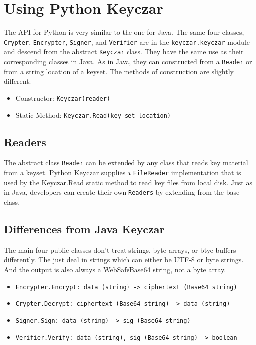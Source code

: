 \documentclass{llncs}
\begin{document}
\section{Using Python Keyczar}

The API for Python is very similar to the one for Java. The same four classes,
{\tt Crypter}, {\tt Encrypter}, {\tt Signer}, and {\tt Verifier} are in the
{\tt keyczar.keyczar} module and descend from the abstract {\tt Keyczar} class.
They have the same use as their corresponding classes in Java. As in Java, they
can constructed from a {\tt Reader} or from a string location of a keyset. The
methods of construction are slightly different:

\begin{itemize}
  \item Constructor: {\tt Keyczar(reader)}
  \item Static Method: \verb|Keyczar.Read(key_set_location)|
\end{itemize}

\subsection{Readers}

The abstract class {\tt Reader} can be extended by any class that reads key
material from a keyset. Python Keyczar supplies a {\tt FileReader}
implementation that is used by the {Keyczar.Read} static method to read key
files from local disk. Just as in Java, developers can create their own
{\tt Readers} by extending from the base class.

\subsection{Differences from Java Keyczar}

The main four public classes don't treat strings, byte arrays, or btye
buffers differently. The just deal in strings which can either be UTF-8 or
byte strings. And the output is also always a WebSafeBase64 string, not a byte
array.
\begin{itemize}
  \item {\tt Encrypter.Encrypt: data (string) -> ciphertext (Base64 string)}
  \item {\tt Crypter.Decrypt: ciphertext (Base64 string) -> data (string)}
  \item {\tt Signer.Sign: data (string) -> sig (Base64 string)}
  \item {\tt Verifier.Verify: data (string), sig (Base64 string) -> boolean}
\end{itemize}
\end{document}
